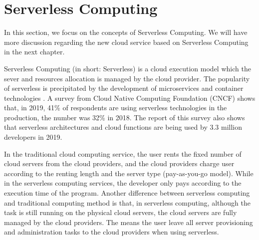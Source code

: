 \section{Serverless Computing}
In this section, we focus on the concepts of Serverless Computing. We will have more discussion regarding the new cloud service based on Serverless Computing in the next chapter.
\par
Serverless Computing (in short: Serverless) is a cloud execution model which the sever and resources allocation is managed by the cloud provider. 
The popularity of serverless is precipitated by the development of microservices and container technologies \cite{baldini2017serverless}. A survey from Cloud Native Computing Foundation (CNCF) shows that, in 2019, 41\% of respondents are using serverless technologies in the production, the number was 32\% in 2018\cite{cncf2020}. The report of this survey also shows that serverless architectures and cloud functions are being used by 3.3 million developers \cite{cncf2020} in 2019.
\par
In the traditional cloud computing service, the user rents the fixed number of cloud servers from the cloud providers, and the cloud providers charge user according to the renting length and the server type (pay-as-you-go model). While in the serverless computing services, the developer only pays according to the execution time of the program. 
Another difference between serverless computing and traditional computing method is that, in serverless computing,  although the task is still running on the physical cloud servers, the cloud servers are fully managed by the cloud providers. The means the user leave all server provisioning and administration tasks to the cloud providers \cite{jonas2019cloud} when using serverless.
